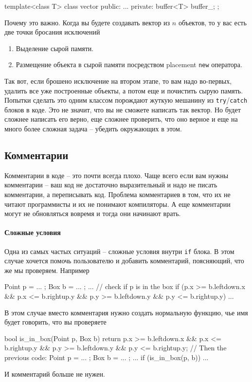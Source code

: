 \begin{enumerate}
\begin{cppcode}
template<class T>
class vector {
public:
  ...
private:
  buffer<T> buffer_;
};
\end{cppcode}
Почему это важно.
Когда вы будете создавать вектор из $n$ объектов, то у вас есть две точки бросания исключений
\begin{enumerate}
\item Выделение сырой памяти.

\item Размещение объекта в сырой памяти посредством placement \verb"new" оператора.
\end{enumerate}
Так вот, если брошено исключение на втором этапе, то вам надо во-первых, удалить все уже построенные объекты, а потом еще и почистить сырую память.
Попытки сделать это одним классом порождают жуткую мешанину из \verb"try"/\verb"catch" блоков в коде.
Это не значит, что вы не сможете написать так вектор.
Но будет сложнее написать его верно, еще сложнее проверить, что оно верное и еще на много более сложная задача -- убедить окружающих в этом.
\end{enumerate}

\subsection{Комментарии}

Комментарии в коде -- это почти всегда плохо.
Чаще всего если вам нужны комментарии -- ваш код не достаточно выразительный и надо не писать комментарии, а переписывать код.
Проблема комментариев в том, что их не читают программисты и их не понимают компиляторы.
А еще комментарии могут не обновляться вовремя и тогда они начинают врать.

\paragraph{Сложные условия}

Одна из самых частых ситуаций -- сложные условия внутри \verb"if" блока.
В этом случае хочется помочь пользователю и добавить комментарий, поясняющий, что же мы проверяем.
Например
\begin{cppcode}
Point p = ... ;
Box b = ... ;
...
// check if p is in the box
if (p.x >= b.leftdown.x && p.x <= b.rightup.y && p.y >= b.leftdown.y && p.y <= b.rightup.y) {
  ...
}
\end{cppcode}
В этом случае вместо комментария нужно создать нормальную функцию, чье имя будет говорить, что вы проверяете
\begin{cppcode}
bool is_in_box(Point p, Box b) {
  return p.x >= b.leftdown.x && p.x <= b.rightup.y && p.y >= b.leftdown.y && p.y <= b.rightup.y;
}
// Then the previous code:
Point p = ... ;
Box b = ... ;
...
if (is_in_box(p, b)) {
  ...
}
\end{cppcode}
И комментарий больше не нужен.

